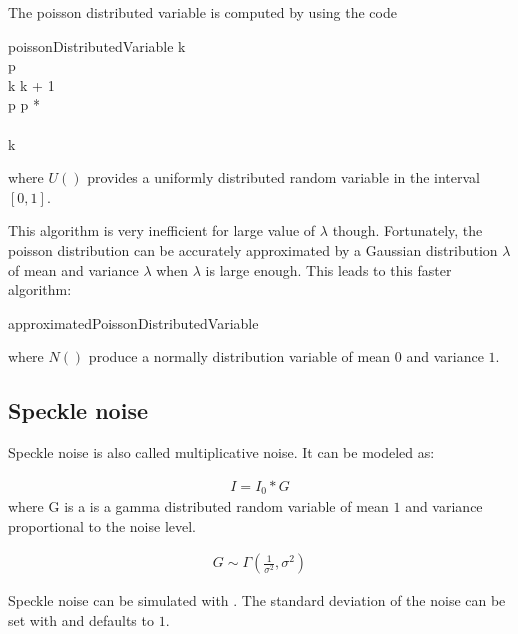 \documentclass{InsightArticle}
\begin{document}
The poisson distributed variable is computed by using the code

\begin{pseudocode}{poissonDistributedVariable}{\lambda}
k  \\
p  \\
\REPEAT
\BEGIN
  k \GETS k + 1 \\
  p \GETS p *  \\
\END
{} \\
\RETURN k
\end{pseudocode}

where $U()$ provides a uniformly distributed random variable in the interval $[0, 1]$.

This algorithm is very inefficient for large value of $\lambda$ though. Fortunately, the poisson
distribution can be accurately approximated by a Gaussian distribution $\lambda$ of mean and
variance $\lambda$ when $\lambda$ is large enough. This leads to this faster algorithm:

\begin{pseudocode}{approximatedPoissonDistributedVariable}{\lambda}
\IF \lambda {}
\THEN
\ELSE
\end{pseudocode}

where $N()$ produce a normally distribution variable of mean $0$ and variance $1$.


\subsection{Speckle noise}

Speckle noise is also called multiplicative noise. It can be modeled as:

\begin{eqnarray}
\label{eq:speckle}
I = I_0 * G
\end{eqnarray}
where G is a is a gamma distributed random variable of mean $1$ and variance proportional to
the noise level.

\begin{eqnarray}
G \sim \Gamma(\frac{1}{\sigma^2},\sigma^2)
\end{eqnarray}

Speckle noise can be simulated with . The standard deviation
of the noise can be set with  and defaults to $1$.
\end{document}

